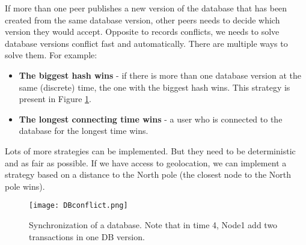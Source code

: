 If more than one peer publishes a new version of the database that has been created from the same database version, other peers needs to decide which version they would accept. Opposite to records conflicts, we needs to solve database versions conflict fast and automatically. There are multiple ways to solve them. For example: 
\begin{itemize}
    \item \textbf{The biggest hash wins} - if there is more than one database version at the same (discrete) time, the one with the biggest hash wins. This strategy is present in Figure \ref{databaseConflict}. 
    \item \textbf{The longest connecting time wins} - a user who is connected to the database for the longest time wins.
\end{itemize}
Lots of more strategies can be implemented. But they need to be deterministic and as fair as possible. If we have access to geolocation, we can implement a strategy based on a distance to the North pole (the closest node to the North pole wins).

\begin{figure}[h]
    \centering
    \texttt{[image: DBconflict.png]}
    \caption{Synchronization of a database. Note that in time 4, Node1 add two transactions in one DB version.}
    \label{databaseConflict}
\end{figure}

